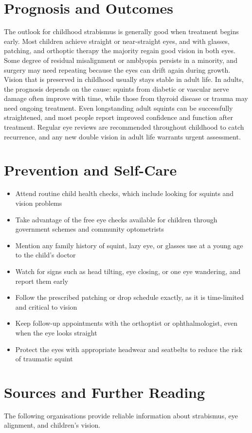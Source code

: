\section*{Prognosis and Outcomes}
The outlook for childhood strabismus is generally good when treatment begins early. Most children achieve straight or near-straight eyes, and with glasses, patching, and orthoptic therapy the majority regain good vision in both eyes. Some degree of residual misalignment or amblyopia persists in a minority, and surgery may need repeating because the eyes can drift again during growth. Vision that is preserved in childhood usually stays stable in adult life. In adults, the prognosis depends on the cause: squints from diabetic or vascular nerve damage often improve with time, while those from thyroid disease or trauma may need ongoing treatment. Even longstanding adult squints can be successfully straightened, and most people report improved confidence and function after treatment. Regular eye reviews are recommended throughout childhood to catch recurrence, and any new double vision in adult life warrants urgent assessment.

\section*{Prevention and Self-Care}
\begin{itemize}
    \item Attend routine child health checks, which include looking for squints and vision problems
    \item Take advantage of the free eye checks available for children through government schemes and community optometrists
    \item Mention any family history of squint, lazy eye, or glasses use at a young age to the child's doctor
    \item Watch for signs such as head tilting, eye closing, or one eye wandering, and report them early
    \item Follow the prescribed patching or drop schedule exactly, as it is time-limited and critical to vision
    \item Keep follow-up appointments with the orthoptist or ophthalmologist, even when the eye looks straight
    \item Protect the eyes with appropriate headwear and seatbelts to reduce the risk of traumatic squint
\end{itemize}

\section*{Sources and Further Reading}
The following organisations provide reliable information about strabismus, eye alignment, and children's vision.

